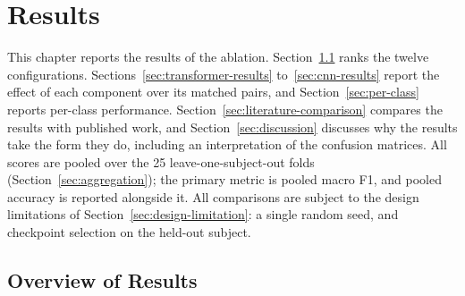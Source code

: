 %
%

\chapter{Results}
\label{ch:results}

This chapter reports the results of the ablation. Section~\ref{sec:results-overview} ranks the twelve configurations. Sections~\ref{sec:transformer-results} to~\ref{sec:cnn-results} report the effect of each component over its matched pairs, and Section~\ref{sec:per-class} reports per-class performance. Section~\ref{sec:literature-comparison} compares the results with published work, and Section~\ref{sec:discussion} discusses why the results take the form they do, including an interpretation of the confusion matrices. All scores are pooled over the 25 leave-one-subject-out folds (Section~\ref{sec:aggregation}); the primary metric is pooled macro F1, and pooled accuracy is reported alongside it. All comparisons are subject to the design limitations of Section~\ref{sec:design-limitation}: a single random seed, and checkpoint selection on the held-out subject.


\section{Overview of Results}
\label{sec:results-overview}

